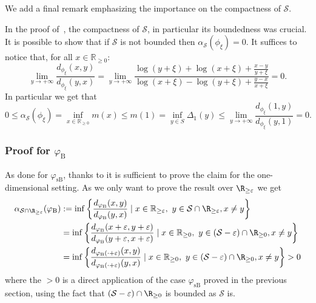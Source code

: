\documentclass[11pt]{amsart}
\begin{document}
We add a final remark emphasizing the importance on the compactness of $\mathcal{S}$.

\begin{remark}
    In the proof of~, the compactness of $\mathcal{S}$, in particular its boundedness was crucial. It is possible to show that if $\mathcal{S}$ is not bounded then $\alpha_{\mathcal{S}}(\phi_\xi)=0$. It suffices to notice that, for all $x \in \mathbb{R}_{\geq 0}$:
    $$
\underset{y \to + \infty}{\operatorname{lim}} \frac{d_{\phi_\xi}(x,y)}{d_{\phi_\xi}(y,x)}=\underset{y \to + \infty}{\operatorname{lim}} \frac{\log (y+\xi)+\log(x+\xi)+\frac{x-y}{y+\xi}}{\log(x+\xi)-\log(y+ \xi)+ \frac{y-x}{x+\xi}}= 0.
    $$
In particular we get that 
$$
0 \leq \alpha_{\mathcal{S}}(\phi_\xi) = \underset{x \in \mathbb{R}_{\geq 0}}{\inf} m(x) \leq  m(1) = \underset{y \in S}{\inf} \Delta_1 (y) \leq \underset{y \to + \infty}{\operatorname{lim}} \frac{d_{\phi_\xi}(1,y)}{d_{\phi_\xi}(y,1)}=0.
$$
\end{remark}

\subsubsection{Proof for $\varphi_\mathrm{B}$}
As done for $\varphi_\mathrm{sB}$, thanks to  it is sufficient to prove the claim  for the one-dimensional setting. As we only want to prove the result over $\R_{\geq \varepsilon}$ we get
\begin{align*}
    \alpha_{\mathcal{S} \cap \R_{\geq \varepsilon}}(\varphi_\mathrm{B})&:=  \inf \left\{\frac{d_{\varphi_\mathrm{B}} (x,y)}{d_{\varphi_\mathrm{B}}(y,x)} \mid x\in \mathbb{R}_{\geq \varepsilon}, \ y \in \mathcal{S} \cap \R_{\geq \varepsilon}, x\neq y\right\} \\
    & =  \inf \left\{\frac{d_{\varphi_\mathrm{B} }(x+\varepsilon,y+\varepsilon)}{d_{\varphi_\mathrm{B}}(y + \varepsilon,x+\varepsilon)} \mid x\in \mathbb{R}_{\geq 0}, \ y \in (\mathcal{S} - \varepsilon) \cap \R_{\geq 0}, x\neq y\right\} \\
    & =  \inf \left\{\frac{d_{\varphi_\mathrm{B}(\cdot + \varepsilon)} (x,y)}{d_{\varphi_\mathrm{B}(\cdot+\varepsilon)}(y ,x)} \mid x\in \mathbb{R}_{\geq 0}, \ y \in (\mathcal{S} - \varepsilon) \cap \R_{\geq 0}, x\neq y\right\} >0
\end{align*}
where the $>0$ is a direct application of the case $\varphi_{\mathrm{sB}}$ proved in the previous section, using the fact that $(\mathcal{S} - \varepsilon) \cap \R_{\geq 0}$ is bounded as $\mathcal{S}$ is.
\end{document}
